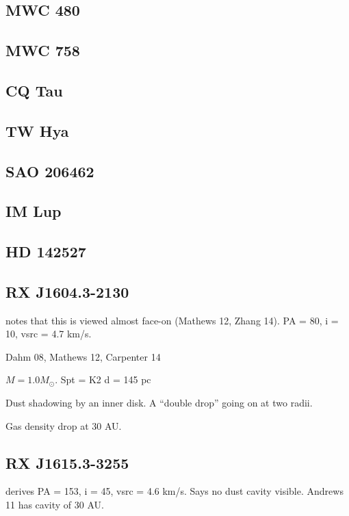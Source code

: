 \documentclass[iop,floatfix,numberedappendix,twocolappendix]{emulateapj}
\begin{document}
\subsection{MWC 480}

\subsection{MWC 758}

\subsection{CQ Tau}

\subsection{TW Hya}

\subsection{SAO 206462}

\subsection{IM Lup}

\subsection{HD 142527}

\subsection{RX J1604.3-2130}
\citep{vandermarel15} notes that this is viewed almost face-on (Mathews 12, Zhang 14). PA = 80, i = 10, vsrc = 4.7 km/s.

Dahm 08, Mathews 12, Carpenter 14

$M = 1.0 M_\odot$.
Spt = K2
d = 145 pc

Dust shadowing by an inner disk. A ``double drop'' going on at two radii.

Gas density drop at 30 AU.

\subsection{RX J1615.3-3255}
\citep{vandermarel15} derives PA = 153, i = 45, vsrc = 4.6 km/s. Says no dust cavity visible. Andrews 11 has cavity of 30 AU.
\end{document}
